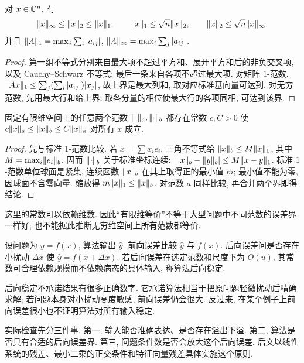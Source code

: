 \begin{proposition}
对 $x\in\mathbb C^n$, 有
\[
\lVert x\rVert_\infty\le\lVert x\rVert_2\le\lVert x\rVert_1,\qquad
\lVert x\rVert_1\le\sqrt n\lVert x\rVert_2,\qquad
\lVert x\rVert_2\le\sqrt n\lVert x\rVert_\infty.
\]
并且 $\lVert A\rVert_1=\max_j\sum_i|a_{ij}|$, $\lVert A\rVert_\infty=\max_i\sum_j|a_{ij}|$.
\end{proposition}
\begin{proof}
第一组不等式分别来自最大项不超过平方和、展开平方和后的非负交叉项, 以及 Cauchy--Schwarz 不等式; 最后一条来自各项不超过最大项. 对矩阵 $1$-范数,
$\lVert Ax\rVert_1\le\sum_j(\sum_i|a_{ij}|)|x_j|$, 故上界是最大列和, 取对应标准基向量可达到. 对无穷范数, 先用最大行和给上界; 取各分量的相位使最大行的各项同相, 可达到该界.
\end{proof}
\begin{theorem}[有限维范数等价]
固定有限维空间上的任意两个范数 $\lVert \cdot\rVert_a,\lVert \cdot\rVert_b$ 都存在常数 $c,C>0$ 使 $c\lVert x\rVert_a\le\lVert x\rVert_b\le C\lVert x\rVert_a$ 对所有 $x$ 成立.
\end{theorem}
\begin{proof}
先与标准 $1$-范数比较. 若 $x=\sum x_ie_i$, 三角不等式给 $\lVert x\rVert_b\le M\lVert x\rVert_1$, 其中 $M=\max_i\lVert e_i\rVert_b$. 因而 $\lVert \cdot\rVert_b$ 关于标准坐标连续: $|\lVert x\rVert_b-\lVert y\rVert_b|\le M\lVert x-y\rVert_1$. 标准 $1$-范数单位球面是紧集, 连续函数 $\lVert x\rVert_b$ 在其上取得正的最小值 $m$; 最小值不能为零, 因球面不含零向量. 缩放得 $m\lVert x\rVert_1\le\lVert x\rVert_b$. 对范数 $a$ 同样比较, 再合并两个界即得结论.
\end{proof}
这里的常数可以依赖维数. 因此“有限维等价”不等于大型问题中不同范数的误差界一样好; 也不能据此推断无穷维空间上所有范数都等价.

\begin{definition}
设问题为 $y=f(x)$, 算法输出 $\widehat y$. 前向误差比较 $\widehat y$ 与 $f(x)$. 后向误差问是否存在小扰动 $\Delta x$ 使 $\widehat y=f(x+\Delta x)$. 若后向误差在选定范数和尺度下为 $O(u)$, 其常数可合理依赖规模而不依赖病态的具体输入, 称算法后向稳定.
\end{definition}
后向稳定不承诺结果有很多正确数字. 它承诺算法相当于把原问题轻微扰动后精确求解; 若问题本身对小扰动高度敏感, 前向误差仍会很大. 反过来, 在某个例子上前向误差很小也不证明算法对所有输入稳定.

实际检查先分三件事. 第一, 输入能否准确表达、是否存在溢出下溢. 第二, 算法是否具有合适的后向误差界. 第三, 问题条件数是否会放大这个后向误差. 后文以线性系统的残差、最小二乘的正交条件和特征向量残差具体实施这个原则.


